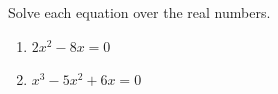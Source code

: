 Solve each equation over the real numbers.
\begin{enumerate}
\item[(a)] $2x^2-8x=0$
\item[(b)] $x^3-5x^2+6x=0$
\end{enumerate}
